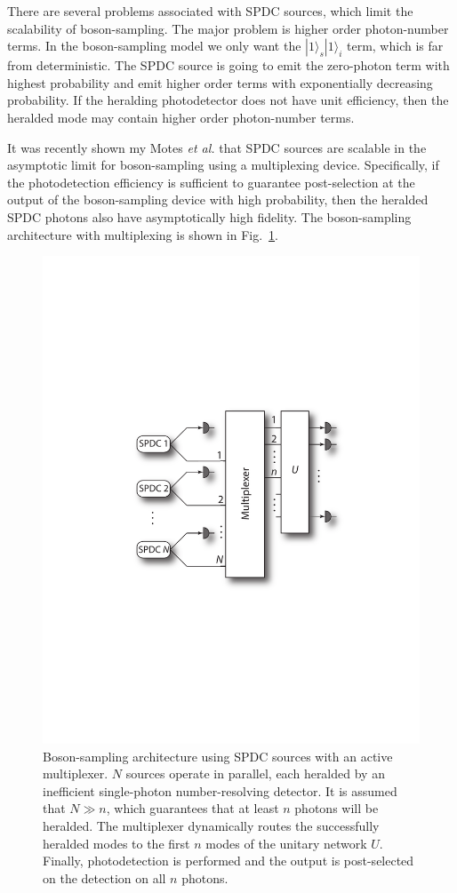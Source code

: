 \documentclass[aps,pra,twocolumn,amsmath,amssymb,nofootinbib,superscriptaddress]{revtex4}
\newcommand{\ket}[1]{|#1\rangle}
\begin{document}
There are several problems associated with SPDC sources, which limit the scalability of boson-sampling. The major problem is higher order photon-number terms. In the boson-sampling model we only want the $\ket{1}_s\ket{1}_i$ term, which is far from deterministic. The SPDC source is going to emit the zero-photon term with highest probability and emit higher order terms with exponentially decreasing probability. If the heralding photodetector does not have unit efficiency, then the heralded mode may contain higher order photon-number terms.

It was recently shown my Motes \emph{et al.} \cite{bib:motes2013spontaneous} that SPDC sources are scalable in the asymptotic limit for boson-sampling using a multiplexing device. Specifically, if the photodetection efficiency is sufficient to guarantee post-selection at the output of the boson-sampling device with high probability, then the heralded SPDC photons also have asymptotically high fidelity. The boson-sampling architecture with multiplexing is shown in Fig.~\ref{fig:multiplexing}. 

\begin{figure}[!htb]
\includegraphics[width=0.7\columnwidth]{multiplexing}
\caption{Boson-sampling architecture using SPDC sources with an active multiplexer. $N$ sources operate in parallel, each heralded by an inefficient single-photon number-resolving detector. It is assumed that \mbox{$N\gg n$}, which guarantees that at least $n$ photons will be heralded. The multiplexer dynamically routes the successfully heralded modes to the first $n$ modes of the unitary network $U$. Finally, photodetection is performed and the output is post-selected on the detection on all $n$ photons.}
\label{fig:multiplexing}
\end{figure}
\end{document}
